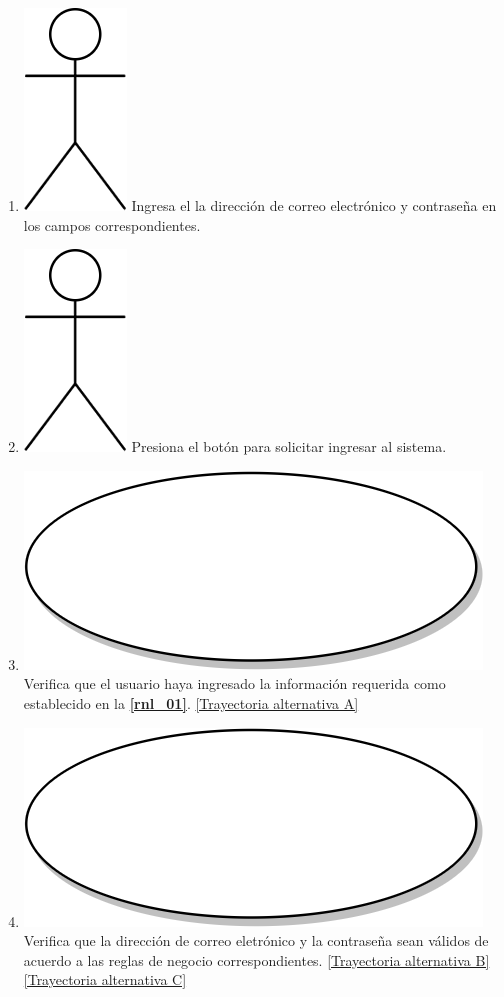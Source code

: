 \begin{enumerate}
  \item {\includegraphics[scale=.1]{Capitulo3/img/actor.png} Ingresa el la dirección de correo electrónico y contraseña en los campos correspondientes.}
  \item {\includegraphics[scale=.1]{Capitulo3/img/actor.png} Presiona el botón para solicitar ingresar al sistema.}
  \item {\includegraphics[scale=.05]{Capitulo3/img/proceso.png} Verifica que el usuario haya ingresado la información requerida como establecido en la \textbf{\ref{rnl_01}}. \hyperref[cu1_ta_a]{[Trayectoria alternativa A]}}
  \item {\includegraphics[scale=.05]{Capitulo3/img/proceso.png} Verifica que la dirección de correo eletrónico y la contraseña sean válidos de acuerdo a las reglas de negocio correspondientes. \hyperref[cu1_ta_b]{[Trayectoria alternativa B]} \hyperref[cu1_ta_c]{[Trayectoria alternativa C]}}

\end{enumerate}
